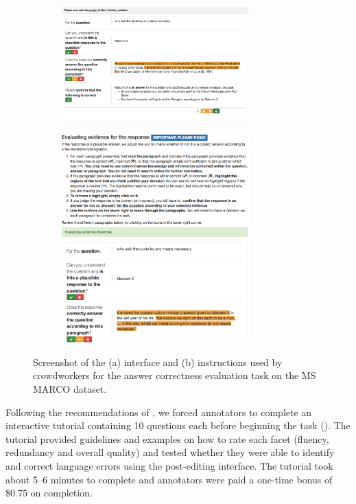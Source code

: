 \begin{figure}
  \begin{subfigure}{\textwidth}
    \centering
    \includegraphics[width=0.8\textwidth]{figures/msmarco_interface}
    \caption{\label{fig:msmarco-interface}}
  \end{subfigure}
  \begin{subfigure}{\textwidth}
    \centering
    \includegraphics[width=0.8\textwidth]{figures/msmarco_tutorial}
    \caption{\label{fig:msmarco-tutorial}}
  \end{subfigure}
  \caption{Screenshot of the (a) interface and (b) instructions used by crowdworkers for the answer correctness evaluation task on the MS MARCO dataset.}
\end{figure}

Following the recommendations of \citet{liu2016effective}, we forced annotators to complete an interactive tutorial containing 10 questions each before beginning the task ().
The tutorial provided guidelines and examples on how to rate each facet (fluency, redundancy and overall quality) and tested whether they were able to identify and correct language errors using the post-editing interface.
The tutorial took about 5--6 minutes to complete and annotators were paid a one-time bonus of \$0.75 on completion.

